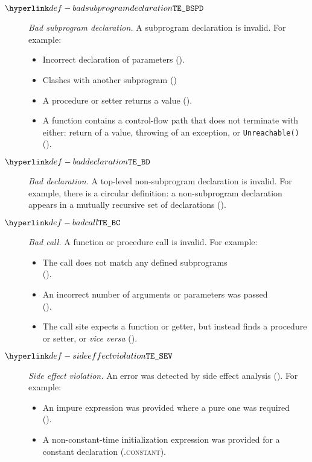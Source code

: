 \begin{description}
\hypertarget{def-badsubprogramdeclaration}{}
\item[$\BadSubprogramDeclaration$]
  \textit{Bad subprogram declaration.}
  A subprogram declaration is invalid.
  For example:
  \begin{itemize}
    \item Incorrect declaration of parameters ().
    \item Clashes with another subprogram ()
    \item A procedure or setter returns a value ().
    \item A function contains a control-flow path that does not terminate with either:
          return of a value, throwing of an exception, or \texttt{Unreachable()} \\
      ().
  \end{itemize}

\hypertarget{def-baddeclaration}{}
\item[$\BadDeclaration$]
  \textit{Bad declaration.}
  A top-level non-subprogram declaration is invalid.
  For example, there is a circular definition: a non-subprogram declaration appears in a mutually recursive set of declarations ().

\hypertarget{def-badcall}{}
\item[$\BadCall$]
  \textit{Bad call.}
  A function or procedure call is invalid.
  For example:
  \begin{itemize}
    \item The call does not match any defined subprograms \\
          ().
    \item An incorrect number of arguments or parameters was passed \\
      ().
    \item The call site expects a function or getter, but instead finds a procedure or setter, or \textit{vice versa} ().
  \end{itemize}

\hypertarget{def-sideeffectviolation}{}
\item[$\SideEffectViolation$]
  \textit{Side effect violation.}
  An error was detected by side effect analysis ().
  For example:
  \begin{itemize}
    \item An impure expression was provided where a pure one was required \\
      ().
    \item A non-constant-time initialization expression was provided for a constant declaration (.\textsc{constant}).
  \end{itemize}


\end{description}
